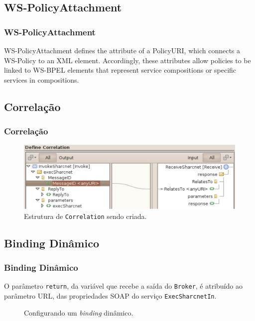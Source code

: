 \documentclass[red, cover=invisible, theme=Warsaw]{myslides}
\begin{document}
\subsection{WS-PolicyAttachment}
\begin{frame}\frametitle{WS-PolicyAttachment}
WS-PolicyAttachment defines the attribute of a PolicyURI, which connects a WS-Policy to an XML element.
Accordingly, these attributes allow policies to be linked to WS-BPEL elements that represent service compositions or specific services in compositions. 
\end{frame}

\subsection{Correlação}
\begin{frame}\frametitle{Correlação}
    \begin{figure}[!htb]%
	\begin{center}
	    \includegraphics[scale=0.50]{imagens/Correlation.pdf} 
	    \caption{Estrutura de \texttt{Correlation} sendo criada.}
	    \label{fig:Correlation}
	\end{center}
    \end{figure}
\end{frame}


\subsection{Binding Dinâmico}
\begin{frame}[fragile]\frametitle{Binding Dinâmico}
O parâmetro \texttt{return}, da variável que recebe a saída do \texttt{Broker}, é atribuído ao parâmetro URL, das propriedades SOAP do serviço \texttt{ExecSharcnetIn}.
\begin{figure}[!htb]
    \centering
    
    \caption{Configurando um \textit{binding} dinâmico.}
\end{figure}    
\end{frame}
\end{document}
